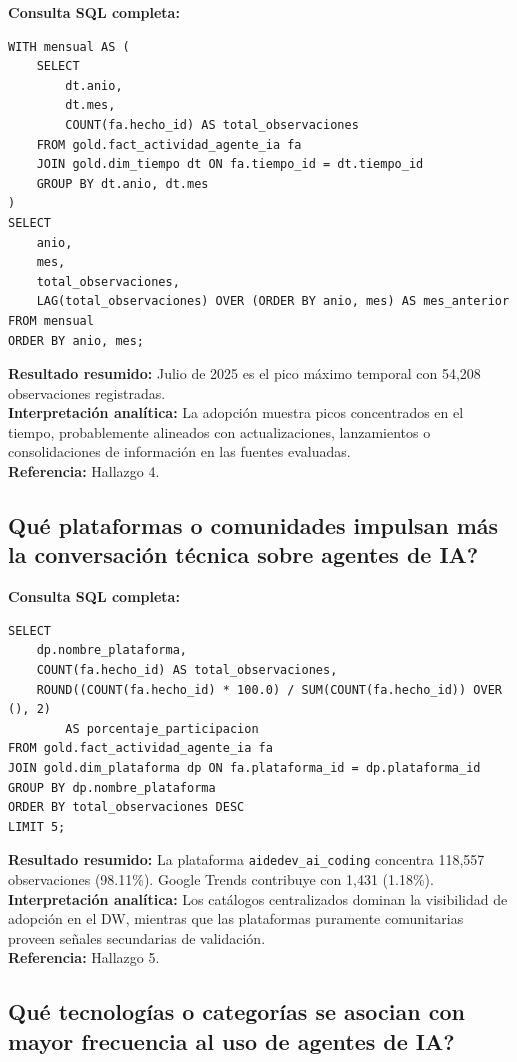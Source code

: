 \documentclass[12pt,a4paper]{article}
\begin{document}
\textbf{Consulta SQL completa:}
\begin{verbatim}
WITH mensual AS (
    SELECT 
        dt.anio,
        dt.mes,
        COUNT(fa.hecho_id) AS total_observaciones
    FROM gold.fact_actividad_agente_ia fa
    JOIN gold.dim_tiempo dt ON fa.tiempo_id = dt.tiempo_id
    GROUP BY dt.anio, dt.mes
)
SELECT 
    anio, 
    mes, 
    total_observaciones,
    LAG(total_observaciones) OVER (ORDER BY anio, mes) AS mes_anterior
FROM mensual
ORDER BY anio, mes;
\end{verbatim}
\textbf{Resultado resumido:} Julio de 2025 es el pico m\'aximo temporal con 54,208 observaciones registradas. \\
\textbf{Interpretaci\'on anal\'itica:} La adopci\'on muestra picos concentrados en el tiempo, probablemente alineados con actualizaciones, lanzamientos o consolidaciones de informaci\'on en las fuentes evaluadas. \\
\textbf{Referencia:} Hallazgo 4.

\subsection{\textquestiondown Qu\'e plataformas o comunidades impulsan m\'as la conversaci\'on t\'ecnica sobre agentes de IA?}

\textbf{Consulta SQL completa:}
\begin{verbatim}
SELECT 
    dp.nombre_plataforma,
    COUNT(fa.hecho_id) AS total_observaciones,
    ROUND((COUNT(fa.hecho_id) * 100.0) / SUM(COUNT(fa.hecho_id)) OVER (), 2) 
        AS porcentaje_participacion
FROM gold.fact_actividad_agente_ia fa
JOIN gold.dim_plataforma dp ON fa.plataforma_id = dp.plataforma_id
GROUP BY dp.nombre_plataforma
ORDER BY total_observaciones DESC
LIMIT 5;
\end{verbatim}
\textbf{Resultado resumido:} La plataforma \texttt{aidedev\_ai\_coding} concentra 118,557 observaciones (98.11\%). Google Trends contribuye con 1,431 (1.18\%). \\
\textbf{Interpretaci\'on anal\'itica:} Los cat\'alogos centralizados dominan la visibilidad de adopci\'on en el DW, mientras que las plataformas puramente comunitarias proveen se\~nales secundarias de validaci\'on. \\
\textbf{Referencia:} Hallazgo 5.

\subsection{\textquestiondown Qu\'e tecnolog\'ias o categor\'ias se asocian con mayor frecuencia al uso de agentes de IA?}
\end{document}
